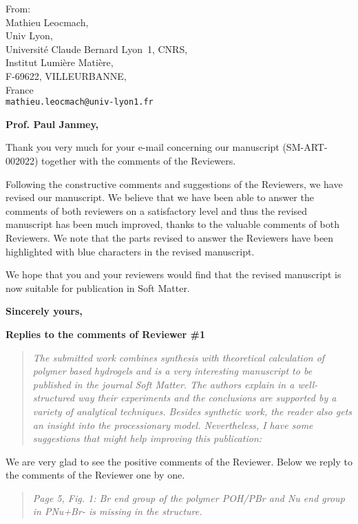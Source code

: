 \documentclass[a4paper, parskip=true, firsthead=false, fromemail=true, foldmarks=false]{scrlttr2}
\newenvironment{quotationi}
{\begin{quotation}\itshape}
{\end{quotation}}
\newcommand{\journal}{Soft Matter}
\begin{document}
\begin{letter}{From:\\
Mathieu Leocmach,\\
Univ Lyon,\\ 
Universit\'e Claude Bernard Lyon~1, CNRS,\\
Institut Lumi\`ere Mati\`ere,\\
F-69622, VILLEURBANNE,\\
France\\
\texttt{mathieu.leocmach@univ-lyon1.fr}
}
\opening{\bf Prof. Paul Janmey,}

Thank you very much for your e-mail concerning our manuscript (SM\nobreakdash-ART-002022) together with the comments of the Reviewers. 

Following the constructive comments and suggestions of the Reviewers, we have revised our manuscript. 
We believe that we have been able to answer the comments of both reviewers on a satisfactory level and thus the revised manuscript has been much improved, thanks to the valuable comments of both Reviewers. We note that the parts revised to answer the Reviewers have been highlighted with blue characters in the revised manuscript.


We hope that you and your reviewers would find that the revised manuscript is now suitable for publication in \journal. 

\closing{\bf Sincerely yours,} 
\clearpage

\textsf{\textbf{Replies to the comments of Reviewer \#1}}

\begin{quotationi}
The submitted work combines synthesis with theoretical calculation of polymer based hydrogels and is a very interesting manuscript to be published in the journal Soft Matter. The authors explain in a well-structured way their experiments and the conclusions are supported by a variety of analytical techniques. Besides synthetic work, the reader also gets an insight into the processionary model. Nevertheless, I have some suggestions that might help improving this publication:
\end{quotationi}

We are very glad to see the positive comments of the Reviewer. Below we reply to the comments of the Reviewer one by one. 


\begin{quotationi}
Page 5, Fig. 1: Br end group of the polymer POH/PBr and Nu end group in PNu+Br- is missing in the structure.
\end{quotationi}


\end{letter}
\end{document}

